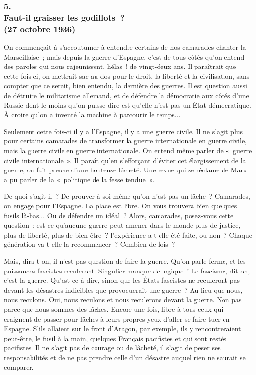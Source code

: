 \documentclass[french,twoside]{book} %
\begin{document}
\subsubsection[5. Faut-il graisser les godillots ? (27 octobre 1936)]{5. \\
Faut-il graisser les godillots ? \\
(27 octobre 1936)}
\noindent \par
On commençait à s'accoutumer à entendre certains de nos camarades chanter la Marseillaise ; mais depuis la guerre d'Espagne, c'est de tous côtés qu'on entend des paroles qui nous rajeunissent, hélas ! de vingt-deux ans. Il paraîtrait que cette fois-ci, on mettrait sac au dos pour le droit, la liberté et la civilisation, sans compter que ce serait, bien entendu, la dernière des guerres. Il est question aussi de détruire le militarisme allemand, et de défendre la démocratie aux côtés d'une Russie dont le moins qu'on puisse dire est qu'elle n'est pas un État démocratique. À croire qu'on a inventé la machine à parcou­rir le temps...\par
Seulement cette fois-ci il y a l'Espagne, il y a une guerre civile. Il ne s'agit plus pour certains camarades de transformer la guerre internationale en guerre civile, mais la guerre civile en guerre internationale. On entend même parler de « guerre civile internationale ». Il paraît qu'en s'efforçant d'éviter cet élar­gissement de la guerre, on fait preuve d'une honteuse lâcheté. Une revue qui se réclame de Marx a pu parler de la « politique de la fesse tendue ».\par
De quoi s'agit-il ? De prouver à soi-même qu'on n'est pas un lâche ? Camarades, on engage pour l'Espagne. La place est libre. On vous trouvera bien quelques fusils là-bas... Ou de défendre un idéal ? Alors, camarades, posez-vous cette question : est-ce qu'aucune guerre peut amener dans le monde plus de justice, plus de liberté, plus de bien-être ? l'expérience a-t-elle été faite, ou non ? Chaque génération va-t-elle la recommencer ? Combien de fois ?\par
Mais, dira-t-on, il n'est pas question de faire la guerre. Qu'on parle ferme, et les puissances fascistes reculeront. Singulier manque de logique ! Le fascisme, dit-on, c'est la guerre. Qu'est-ce à dire, sinon que les États fascistes ne reculeront pas devant les désastres indicibles que provoquerait une guerre ? Au lieu que nous, nous reculons. Oui, nous reculons et nous reculerons devant la guerre. Non pas parce que nous sommes des lâches. Encore une fois, libre à tous ceux qui craignent de passer pour lâches à leurs propres yeux d'aller se faire tuer en Espagne. S'ils allaient sur le front d'Aragon, par exemple, ils y rencontreraient peut-être, le fusil à la main, quelques Français pacifistes et qui sont restés pacifistes. Il ne s'agit pas de courage ou de lâcheté, il s'agit de peser ses responsabilités et de ne pas prendre celle d'un désastre auquel rien ne saurait se comparer.\par
\end{document}
